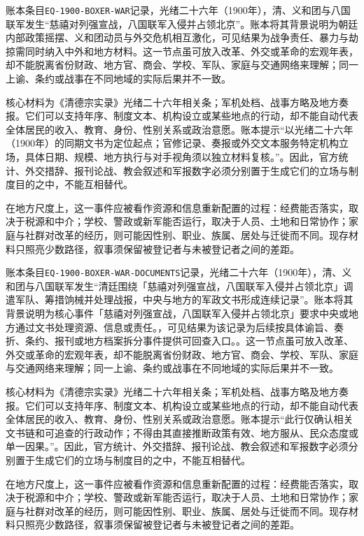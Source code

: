 账本条目\texttt{EQ-1900-BOXER-WAR}记录，光绪二十六年（1900年），清、义和团与八国联军发生“慈禧对列强宣战，八国联军入侵并占领北京”。账本将其背景说明为朝廷内部政策摇摆、义和团动员与外交危机相互激化，可见结果为战争责任、暴力与劫掠需同时纳入中外和地方材料。这一节点虽可放入改革、外交或革命的宏观年表，却不能脱离省份财政、地方官、商会、学校、军队、家庭与交通网络来理解；同一上谕、条约或战事在不同地域的实际后果并不一致。

核心材料为《清德宗实录》光绪二十六年相关条；军机处档、战事方略及地方奏报。它们可以支持年序、制度文本、机构设立或某些地点的行动，却不能自动代表全体居民的收入、教育、身份、性别关系或政治意愿。账本提示“以光绪二十六年（1900年）的同期文书为定位起点；官修记录、奏报或外交文本服务特定机构立场，具体日期、规模、地方执行与对手视角须以独立材料复核。”。因此，官方统计、外交措辞、报刊论战、教会叙述和军报数字必须分别置于生成它们的立场与制度目的之中，不能互相替代。

在地方尺度上，这一事件应被看作资源和信息重新配置的过程：经费能否落实，取决于税源和中介；学校、警政或新军能否运行，取决于人员、土地和日常协作；家庭与社群对改革的经历，则可能因性别、职业、族属、居处与迁徙而不同。现存材料只照亮少数路径，叙事须保留被登记者与未被登记者之间的差距。

账本条目\texttt{EQ-1900-BOXER-WAR-DOCUMENTS}记录，光绪二十六年（1900年），清、义和团与八国联军发生“清廷围绕「慈禧对列强宣战，八国联军入侵并占领北京」调遣军队、筹措饷械并处理战报，中央与地方的军政文书形成连续记录”。账本将其背景说明为核心事件「慈禧对列强宣战，八国联军入侵并占领北京」要求中央或地方通过文书处理资源、信息或责任。，可见结果为该记录为后续按具体谕旨、奏折、条约、报刊或地方档案拆分事件提供可回查入口。。这一节点虽可放入改革、外交或革命的宏观年表，却不能脱离省份财政、地方官、商会、学校、军队、家庭与交通网络来理解；同一上谕、条约或战事在不同地域的实际后果并不一致。

核心材料为《清德宗实录》光绪二十六年相关条；军机处档、战事方略及地方奏报。它们可以支持年序、制度文本、机构设立或某些地点的行动，却不能自动代表全体居民的收入、教育、身份、性别关系或政治意愿。账本提示“此行仅确认相关文书链和可追查的行政动作；不得由其直接推断政策有效、地方服从、民众态度或单一因果。”。因此，官方统计、外交措辞、报刊论战、教会叙述和军报数字必须分别置于生成它们的立场与制度目的之中，不能互相替代。

在地方尺度上，这一事件应被看作资源和信息重新配置的过程：经费能否落实，取决于税源和中介；学校、警政或新军能否运行，取决于人员、土地和日常协作；家庭与社群对改革的经历，则可能因性别、职业、族属、居处与迁徙而不同。现存材料只照亮少数路径，叙事须保留被登记者与未被登记者之间的差距。

